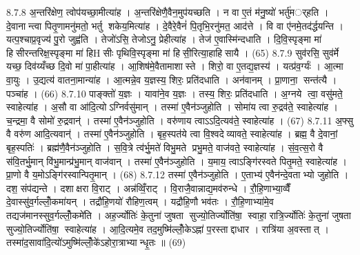 8.7.8
अ॒न्तरि॑क्षेण॒ त्वोप॑यच्छा॒मीत्या॑ह । अ॒न्तरि॑क्षेणै॒वैन॒मुप॑यच्छति । न वा ए॒तं म॑नु॒ष्यो॑ भर्तु॑मर््हति । दे॒वानान्त्वा पितृ॒णामनु॑मतो॒ भर्तु शकेय॒मित्या॑ह । दे॒वैरे॒वैनं॑ पि॒तृभि॒रनु॑मत॒ आद॑त्ते । वि वा ए॑नमे॒तद॑र्द्धयन्ति । यत्प॒श्चाप्र॒वृज्य॑ पु॒रो जुह्व॑ति । तेजो॑ऽसि॒ तेजोऽनु॒ प्रेहीत्या॑ह । तेज॑ ए॒वास्मि॑न्दधाति । दि॒वि॒स्पृङ्मा मा॑ हिसीरन्तरिक्ष॒स्पृङ्मा मा॑ हिHसीः पृथिवि॒स्पृङ्मा मा॑ हिसी॒रित्या॒हाहिसायै । (65)
8.7.9
सुव॑रसि॒ सुव॑र्मे यच्छ॒ दिव॑य्यँच्छ दि॒वो मा॑ पा॒हीत्या॑ह । आ॒शिष॑मे॒वैतामाशास्ते । शिरो॒ वा ए॒तद्य॒ज्ञस्य॑ । यत्प्र॑व॒र्ग्यः॑ । आ॒त्मा वा॒युः । उ॒द्यत्य॑ वातना॒मान्या॑ह । आ॒त्मन्ने॒व य॒ज्ञस्य॒ शिरः॒ प्रति॑दधाति । अन॑वानम् । प्रा॒णाना॒ सन्त॑त्यै । पञ्चा॑ह । (66)
8.7.10
पाङ्क्तो॑ य॒ज्ञः । यावा॑ने॒व य॒ज्ञः । तस्य॒ शिरः॒ प्रति॑दधाति । अ॒ग्नये त्वा॒ वसु॑मते॒ स्वाहेत्या॑ह । अ॒सौ वा आ॑दि॒त्योऽग्निर्वसु॑मान् । तस्मा॑ ए॒वैन॑ञ्जुहोति । सोमा॑य त्वा रु॒द्रव॑ते॒ स्वाहेत्या॑ह । च॒न्द्रमा॒ वै सोमो॑ रु॒द्रवान्॑ । तस्मा॑ ए॒वैन॑ञ्जुहोति । वरु॑णाय त्वाऽऽदि॒त्यव॑ते॒ स्वाहेत्या॑ह । (67)
8.7.11
अ॒फ्सु वै वरु॑ण आदि॒त्यवान्॑ । तस्मा॑ ए॒वैन॑ञ्जुहोति । बृह॒स्पत॑ये त्वा वि॒श्वदेव्यावते॒ स्वाहेत्या॑ह । ब्रह्म॒ वै दे॒वानां॒ बृह॒स्पतिः॑ । ब्रह्म॑णै॒वैन॑ञ्जुहोति । स॒वि॒त्रे त्व॑र्भु॒मते॑ विभु॒मते प्रभु॒मते॒ वाज॑वते॒ स्वाहेत्या॑ह । सं॒व॒त्स॒रो वै स॑वि॒तर्भु॒मान् वि॑भु॒मान्प्र॑भु॒मान् वाज॑वान् । तस्मा॑ ए॒वैन॑ञ्जुहोति । य॒माय॒ त्वाऽङ्गि॑रस्वते पितृ॒मते॒ स्वाहेत्या॑ह । प्रा॒णो वै य॒मोऽङ्गि॑रस्वान्पितृ॒मान् । (68)
8.7.12
तस्मा॑ ए॒वैन॑ञ्जुहोति । ए॒ताभ्य॑ ए॒वैन॑न्दे॒वताभ्यो जुहोति । दश॒ संप॑द्यन्ते । दशाक्षरा वि॒राट् । अन्न॑व्विँ॒राट् । वि॒राजै॒वान्नाद्य॒मव॑रुन्धे । रौ॒हि॒णाभ्या॒व्वैँ दे॒वास्सु॑व॒र्गल्लोँ॒कमा॑यन् । तद्रौ॑हि॒णयो॑ रौहिण॒त्वम् । यद्रौ॑हि॒णौ भव॑तः । रौ॒हि॒णाभ्या॑मे॒व तद्यज॑मानस्सुव॒र्गल्लोँ॒कमे॑ति । अह॒र्ज्योतिः॑ के॒तुना॑ जुषता सुज्यो॒तिर्ज्योति॑षा॒ स्वाहा॒ रात्रि॒र्ज्योतिः॑ के॒तुना॑ जुषता सुज्यो॒तिर्ज्योति॑षा॒ स्वाहेत्या॑ह । आ॒दि॒त्यमे॒व तद॒मुष्मि॑ल्लोँ॒केऽह्ना॑ प॒रस्ताद्दाधार । रात्रि॑या अ॒वस्तात् । तस्मा॑द॒सावा॑दि॒त्यो॑ऽमुष्मि॑ल्लोँ॒के॑ऽहोरा॒त्राभ्यान्धृ॒तः ॥ (69)
\anuvakamend


